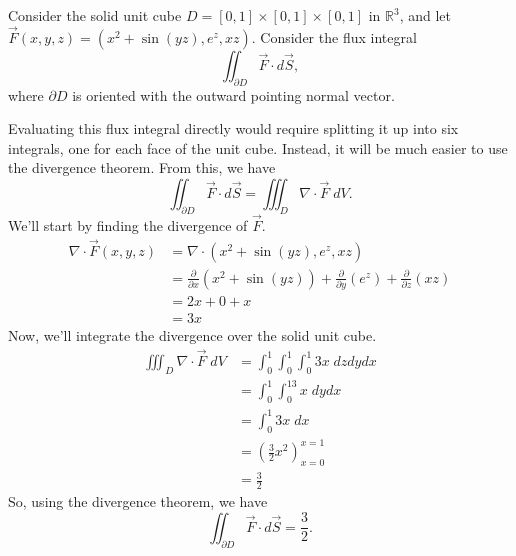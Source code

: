 \documentclass{ximera}
\begin{document}
\begin{example}
Consider the solid unit cube $D = [0,1]\times [0,1]\times [0,1]$ in $\mathbb{R}^3$,  and let $\vec{F}(x,y,z) = \left(x^2 + \sin(yz), e^{z}, xz\right)$. Consider the flux integral
\[
\iint_{\partial D} \vec{F}\cdot d\vec{S},
\]
where $\partial D$ is oriented with the outward pointing normal vector.

Evaluating this flux integral directly would require splitting it up into six integrals, one for each face of the unit cube. Instead, it will be much easier to use the divergence theorem. From this, we have
\[
\iint_{\partial D} \vec{F}\cdot d\vec{S} = \iiint_D \nabla\cdot \vec{F}\;dV.
\]
We'll start by finding the divergence of $\vec{F}$.
\begin{align*}
\nabla\cdot \vec{F}(x,y,z) &= \nabla\cdot \left(x^2 + \sin(yz), e^{z}, xz\right)\\
&=\frac{\partial}{\partial x}(x^2 + \sin(yz)) + \frac{\partial}{\partial y}(e^{z}) + \frac{\partial}{\partial z}(xz)\\
&= 2x+0+x\\
&= 3x
\end{align*}
Now, we'll integrate the divergence over the solid unit cube.
\begin{align*}
 \iiint_D \nabla\cdot \vec{F}\;dV &= \int_0^1\int_0^1\int_0^1 3x\;dzdydx\\
 &= \int_0^1\int_0^13x\;dydx\\
 &= \int_0^1 3x\;dx\\
 &= \left(\frac{3}{2}x^2\right)_{x=0}^{x=1}\\
 &= \frac{3}{2}
\end{align*}
So, using the divergence theorem, we have
\[
\iint_{\partial D} \vec{F}\cdot d\vec{S} = \frac{3}{2}.
\]
\end{example}
\end{document}

